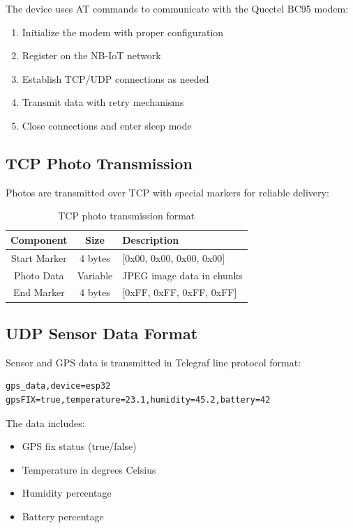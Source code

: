 \documentclass[11pt,a4paper]{article}
\begin{document}
The device uses AT commands to communicate with the Quectel BC95 modem:

\begin{enumerate}
    \item Initialize the modem with proper configuration
    \item Register on the NB-IoT network
    \item Establish TCP/UDP connections as needed
    \item Transmit data with retry mechanisms
    \item Close connections and enter sleep mode
\end{enumerate}

\subsection{TCP Photo Transmission}

Photos are transmitted over TCP with special markers for reliable delivery:

\begin{table}[h]
\centering
\begin{tabular}{@{}ccl@{}}
\toprule
\textbf{Component} & \textbf{Size} & \textbf{Description} \\
\midrule
Start Marker & 4 bytes & [0x00, 0x00, 0x00, 0x00] \\
Photo Data & Variable & JPEG image data in chunks \\
End Marker & 4 bytes & [0xFF, 0xFF, 0xFF, 0xFF] \\
\bottomrule
\end{tabular}
\caption{TCP photo transmission format}
\label{tab:tcp}
\end{table}

\subsection{UDP Sensor Data Format}

Sensor and GPS data is transmitted in Telegraf line protocol format:

\begin{lstlisting}[language=text, caption=UDP Data Format]
gps_data,device=esp32 gpsFIX=true,temperature=23.1,humidity=45.2,battery=42
\end{lstlisting}

The data includes:
\begin{itemize}
    \item GPS fix status (true/false)
    \item Temperature in degrees Celsius
    \item Humidity percentage
    \item Battery percentage
\end{itemize}
\end{document}
